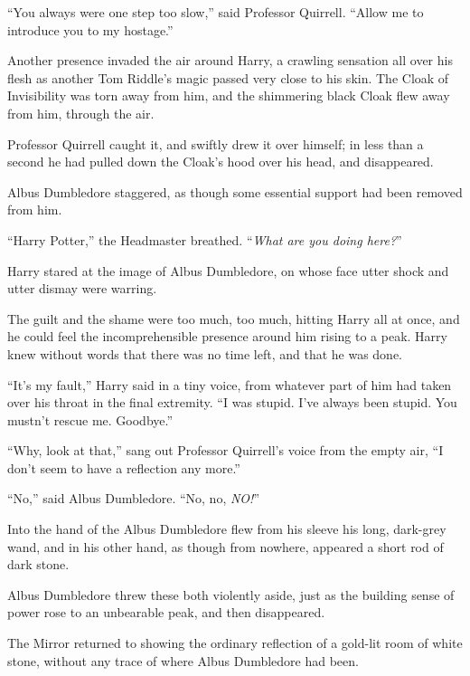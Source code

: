 ``You always were one step too slow,'' said Professor Quirrell. ``Allow me to introduce you to my hostage.''

Another presence invaded the air around Harry, a crawling sensation all over his flesh as another Tom Riddle's magic passed very close to his skin. The Cloak of Invisibility was torn away from him, and the shimmering black Cloak flew away from him, through the air.

Professor Quirrell caught it, and swiftly drew it over himself; in less than a second he had pulled down the Cloak's hood over his head, and disappeared.

Albus Dumbledore staggered, as though some essential support had been removed from him.

``Harry Potter,'' the Headmaster breathed. ``\emph{What are you doing here?}''

Harry stared at the image of Albus Dumbledore, on whose face utter shock and utter dismay were warring.

The guilt and the shame were too much, too much, hitting Harry all at once, and he could feel the incomprehensible presence around him rising to a peak. Harry knew without words that there was no time left, and that he was done.

``It's my fault,'' Harry said in a tiny voice, from whatever part of him had taken over his throat in the final extremity. ``I was stupid. I've always been stupid. You mustn't rescue me. Goodbye.''

``Why, look at that,'' sang out Professor Quirrell's voice from the empty air, ``I don't seem to have a reflection any more.''

``No,'' said Albus Dumbledore. ``No, no, \emph{NO!}''

Into the hand of the Albus Dumbledore flew from his sleeve his long, dark-grey wand, and in his other hand, as though from nowhere, appeared a short rod of dark stone.

Albus Dumbledore threw these both violently aside, just as the building sense of power rose to an unbearable peak, and then disappeared.

The Mirror returned to showing the ordinary reflection of a gold-lit room of white stone, without any trace of where Albus Dumbledore had been.
